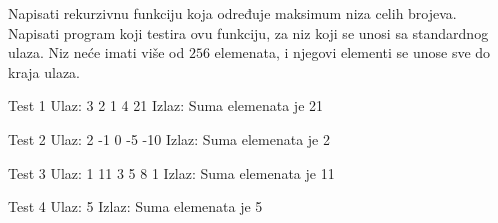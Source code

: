 
\begin{Exercise}[label=109]
Napisati rekurzivnu funkciju koja određuje maksimum niza
  celih brojeva. Napisati program koji testira ovu funkciju, za niz
  koji se unosi sa standardnog ulaza. Niz neće imati više od $256$ elemenata, i
  njegovi elementi se unose sve do kraja ulaza.
  
\begin{miditest}
\begin{test}{Test 1}
Ulaz:   3 2 1 4 21    
Izlaz:  
 Suma elemenata je 21              
\end{test}
\end{miditest}
\begin{miditest}
\begin{test}{Test 2}
Ulaz:   2 -1 0 -5 -10
Izlaz:  
  Suma elemenata je 2                
\end{test}
\end{miditest}

\begin{miditest}
\begin{test}{Test 3}
Ulaz:  1 11 3 5 8 1    
Izlaz: 
  Suma elemenata je 11
\end{test}
\end{miditest}
\begin{minitest}
\begin{test}{Test 4}
Ulaz:   5
Izlaz:  
  Suma elemenata je 5
\end{test}
\end{minitest}

\end{Exercise}
\begin{Answer}[ref=109]
\end{Answer}

